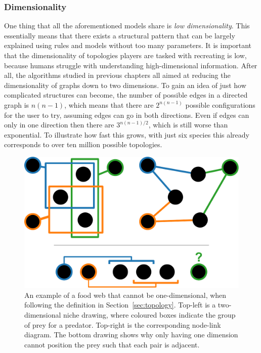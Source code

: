 \subsubsection{Dimensionality}
One thing that all the aforementioned models share is \emph{low dimensionality}. This essentially means that there exists a structural pattern that can be largely explained using rules and models without too many parameters.
It is important that the dimensionality of topologies players are tasked with recreating is low, because humans struggle with understanding high-dimensional information. After all, the algorithms studied in previous chapters all aimed at reducing the dimensionality of graphs down to two dimensions. To gain an idea of just how complicated structures can become, the number of possible edges in a directed graph is $n(n-1)$, which means that there are $2^{n(n-1)}$ possible configurations for the user to try, assuming edges can go in both directions. Even if edges can only in one direction then there are $3^{n(n-1)/2}$, which is still worse than exponential. To illustrate how fast this grows, with just six species this already corresponds to over ten million possible topologies.

\begin{figure}
  \centering
  \includegraphics[width=.85\textwidth]{joy/niche.pdf}
  \caption[An illustration of food web dimensionality]{An example of a food web that cannot be one-dimensional, when following the definition in Section~\ref{sec:topology}. Top-left is a two-dimensional niche drawing, where coloured boxes indicate the group of prey for a predator. Top-right is the corresponding node-link diagram.
  The bottom drawing shows why only having one dimension cannot position the prey such that each pair is adjacent.}
  \label{fig:niche}
\end{figure}

